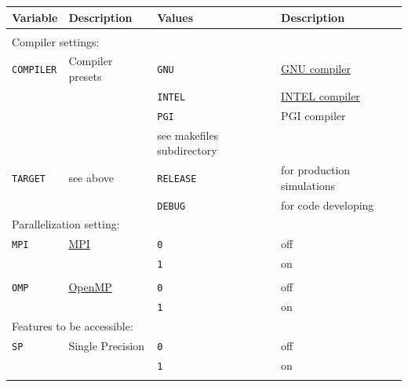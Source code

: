 

\renewcommand{\arraystretch}{1.2}
\begin{table}[h!]
	\centering
	\begin{tabular}{llll}
		\toprule
		Variable & Description & Values & Description \\
		\midrule
		&                           &  &  \\
		
		\multicolumn{4}{l}{{Compiler settings:}}\\
		\midrule
		\texttt{COMPILER} & Compiler presets          & \texttt{GNU}   & \href{http://www.gnu.org/software/gcc/}{GNU compiler} \\
		&                           & \texttt{INTEL} & \href{https://software.intel.com/en-us/intel-compilers}{INTEL compiler} \\
		&                           & \texttt{PGI} & PGI compiler \\
		&                           & {\tiny see makefiles subdirectory} \\
		
		\texttt{TARGET}   & see above                 & \texttt{RELEASE} & for production simulations \\
		&                           & \texttt{DEBUG} & for code developing   \\
		
		\multicolumn{4}{l}{{Parallelization setting:}}\\
		\midrule
		\texttt{MPI}      & \href{http://mpi-forum.org/}{MPI} & \texttt{0} & off \\
		&                                   & \texttt{1} & on \\
		&                           &  &  \\
		
		\texttt{OMP}      & \href{http://openmp.org/}{OpenMP} & \texttt{0} & off \\
		&                                   & \texttt{1} & on \\
		
		\multicolumn{4}{l}{{Features to be accessible:}}\\
		\midrule
		\texttt{SP}       & Single Precision          & \texttt{0} & off \\
		&                           & \texttt{1} & on \\
		&                           &  &  \\
		

\end{tabular}
\end{table}
